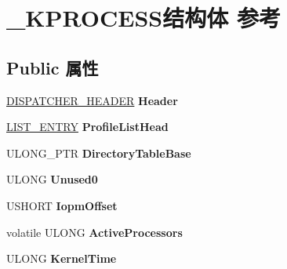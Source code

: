 \hypertarget{struct___k_p_r_o_c_e_s_s}{}\section{\+\_\+\+K\+P\+R\+O\+C\+E\+S\+S结构体 参考}
\label{struct___k_p_r_o_c_e_s_s}
\subsection*{Public 属性}
\begin{DoxyCompactItemize}
\item 
\mbox{\label{struct___k_p_r_o_c_e_s_s_a062eca74b5ec4db83bca8d8824881c4e}} 
\hyperlink{struct___d_i_s_p_a_t_c_h_e_r___h_e_a_d_e_r}{D\+I\+S\+P\+A\+T\+C\+H\+E\+R\+\_\+\+H\+E\+A\+D\+ER} {\bfseries Header}
\item 
\mbox{\label{struct___k_p_r_o_c_e_s_s_aa3da6856cd50d76503e8e3bde6e06044}} 
\hyperlink{struct___l_i_s_t___e_n_t_r_y}{L\+I\+S\+T\+\_\+\+E\+N\+T\+RY} {\bfseries Profile\+List\+Head}
\item 
\mbox{\label{struct___k_p_r_o_c_e_s_s_a833c90da0b773b90fe5a3484f70eefb2}} 
U\+L\+O\+N\+G\+\_\+\+P\+TR {\bfseries Directory\+Table\+Base}
\item 
\mbox{\label{struct___k_p_r_o_c_e_s_s_ab6bae0cff7af1e78ddf6e0b90dbdc856}} 
U\+L\+O\+NG {\bfseries Unused0}
\item 
\mbox{\label{struct___k_p_r_o_c_e_s_s_a3f72356edc8b58b611e0010b062a5fb3}} 
U\+S\+H\+O\+RT {\bfseries Iopm\+Offset}
\item 
\mbox{\label{struct___k_p_r_o_c_e_s_s_a54284e393630627c1c901e2d081352a9}} 
volatile U\+L\+O\+NG {\bfseries Active\+Processors}
\item 
\mbox{\label{struct___k_p_r_o_c_e_s_s_a794de3a07823929d3e8d30c1853a600f}} 
U\+L\+O\+NG {\bfseries Kernel\+Time}
\item 
\mbox{\label{struct___k_p_r_o_c_e_s_s_a8f4818cffc9e97acc00acc871e02be6d}} 

\end{DoxyCompactItemize}
